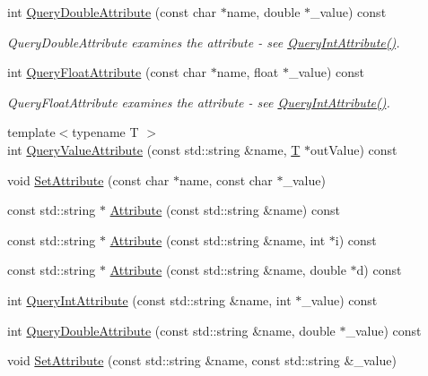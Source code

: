 \begin{DoxyCompactItemize}
\item 
int \hyperlink{class_ti_xml_element_ae04bad29ddb281a7e6c662b3882e9928}{Query\+Double\+Attribute} (const char $\ast$name, double $\ast$\+\_\+value) const
\begin{DoxyCompactList}\small\item\em Query\+Double\+Attribute examines the attribute -\/ see \hyperlink{class_ti_xml_element_a5c0f739e0f6f5905a201364532e54a60}{Query\+Int\+Attribute()}. \end{DoxyCompactList}\item 
int \hyperlink{class_ti_xml_element_a5591929834178699b4561ab6ab460068}{Query\+Float\+Attribute} (const char $\ast$name, float $\ast$\+\_\+value) const
\begin{DoxyCompactList}\small\item\em Query\+Float\+Attribute examines the attribute -\/ see \hyperlink{class_ti_xml_element_a5c0f739e0f6f5905a201364532e54a60}{Query\+Int\+Attribute()}. \end{DoxyCompactList}\item 
{\footnotesize template$<$typename T $>$ }\\int \hyperlink{class_ti_xml_element_a7530db879b81ebaba61bf62a9770d204}{Query\+Value\+Attribute} (const std\+::string \&name, \hyperlink{class_t}{T} $\ast$out\+Value) const
\item 
void \hyperlink{class_ti_xml_element_abf0b3bd7f0e4c746a89ec6e7f101fc32}{Set\+Attribute} (const char $\ast$name, const char $\ast$\+\_\+value)
\item 
const std\+::string $\ast$ \hyperlink{class_ti_xml_element_a9c3d9bfacd95cf549fcd859238bb8f93}{Attribute} (const std\+::string \&name) const
\item 
const std\+::string $\ast$ \hyperlink{class_ti_xml_element_a51227b271c63c370eb3477b25a529606}{Attribute} (const std\+::string \&name, int $\ast$i) const
\item 
const std\+::string $\ast$ \hyperlink{class_ti_xml_element_abf7279768e400864271dc163258bb1e9}{Attribute} (const std\+::string \&name, double $\ast$d) const
\item 
int \hyperlink{class_ti_xml_element_aa368685cfa6efae820b8e7ec18114865}{Query\+Int\+Attribute} (const std\+::string \&name, int $\ast$\+\_\+value) const
\item 
int \hyperlink{class_ti_xml_element_a442a0180263ff9a61d30711dc213d9e4}{Query\+Double\+Attribute} (const std\+::string \&name, double $\ast$\+\_\+value) const
\item 
void \hyperlink{class_ti_xml_element_a80ed65b1d194c71c6c9986ae42337d7d}{Set\+Attribute} (const std\+::string \&name, const std\+::string \&\+\_\+value)

\end{DoxyCompactItemize}
